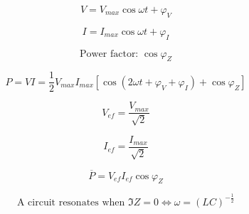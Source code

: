 \documentclass{form}
\begin{document}
\begin{minipage}[c]{0.18\textwidth}
	\begin{equation*}
		V=V_{max}\cos{\omega t + \varphi_V}
	\end{equation*}
\end{minipage}
\begin{minipage}[c]{0.18\textwidth}
	\begin{equation*}
		I=I_{max}\cos{\omega t + \varphi_I}
	\end{equation*}
\end{minipage}
\begin{minipage}[c]{0.19\textwidth}
	\begin{equation*}
		\text{Power factor: } \cos \varphi_Z
	\end{equation*}
\end{minipage}
\begin{minipage}[c]{0.43\textwidth}
	\begin{equation*}
		P=VI=\frac{1}{2}V_{max}I_{max}[\cos(2\omega t + \varphi_V + \varphi_I) + \cos \varphi_Z]
	\end{equation*}
\end{minipage}
\begin{minipage}[c]{0.1\textwidth}
	\begin{equation*}
		V_{ef}=\frac{V_{max}}{\sqrt{2}}
	\end{equation*}
\end{minipage}
\begin{minipage}[c]{0.1\textwidth}
	\begin{equation*}
		I_{ef}=\frac{I_{max}}{\sqrt{2}}
	\end{equation*}
\end{minipage}
\begin{minipage}[c]{0.15\textwidth}
	\begin{equation*}
		\overline{P}=V_{ef}I_{ef}\cos \varphi_Z
	\end{equation*}
\end{minipage}
\begin{minipage}[c]{0.45\textwidth}
	\begin{equation*}
		\text{A circuit resonates when } \Im{Z}=0 \iff \omega = (LC)^{-\frac{1}{2}}
	\end{equation*}
\end{minipage}\\
\end{document}
